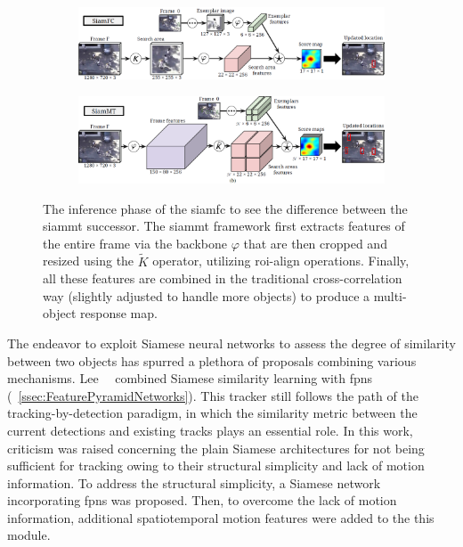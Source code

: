 \begin{figure}[!t]
    \centering
    \begin{subfigure}[b]{\textwidth}
        \centering
        \includegraphics[width=\textwidth]{figures/theoretical_foundations/siammt_orig.png}
        \caption[]{}
    \end{subfigure}
    \begin{subfigure}[b]{\textwidth}
        \centering
        \includegraphics[width=\textwidth]{figures/theoretical_foundations/siammt_new.png}
        \caption[]{}
    \end{subfigure}
    \caption[\gls{siammt} architecture]{The inference phase of the  \gls{siamfc} to see the difference between the  \gls{siammt} successor. The \gls{siammt} framework first extracts features of the entire frame via the backbone $\varphi$ that are then cropped and resized using the $\tilde{K}$ operator, utilizing \gls{roi}-align operations. Finally, all these features are combined in the traditional cross-correlation way (slightly adjusted to handle more objects) to produce a multi-object response map. }
    \label{fig:SiamMTArchitecture}
\end{figure}

The endeavor to exploit Siamese neural networks to assess the degree of similarity between two objects has spurred a plethora of proposals combining various mechanisms. Lee~\etal{}~\cite{lee2019motfpsn} combined Siamese similarity learning with \glspl{fpn} (\sectiontext{}~\ref{ssec:FeaturePyramidNetworks}). This tracker still follows the path of the tracking-by-detection paradigm, in which the similarity metric between the current detections and existing tracks plays an essential role. In this work, criticism was raised concerning the plain Siamese architectures for not being sufficient for tracking owing to their structural simplicity and lack of motion information. To address the structural simplicity, a Siamese network incorporating \glspl{fpn} was proposed. Then, to overcome the lack of motion information, additional spatiotemporal motion features were added to the this module.

